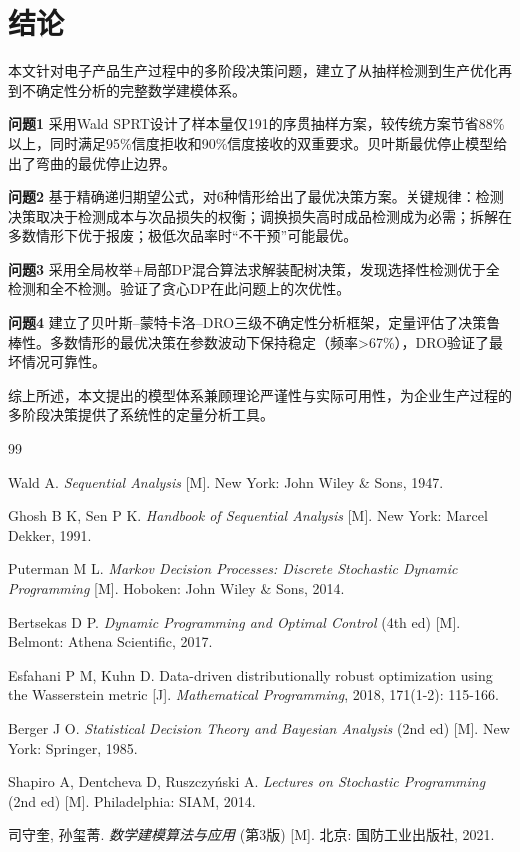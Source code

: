 \documentclass[12pt,a4paper]{ctexart}
\begin{document}
\section{结论}

本文针对电子产品生产过程中的多阶段决策问题，建立了从抽样检测到生产优化再到不确定性分析的完整数学建模体系。

\textbf{问题1} 采用Wald SPRT设计了样本量仅191的序贯抽样方案，较传统方案节省88\%以上，同时满足95\%信度拒收和90\%信度接收的双重要求。贝叶斯最优停止模型给出了弯曲的最优停止边界。

\textbf{问题2} 基于精确递归期望公式，对6种情形给出了最优决策方案。关键规律：检测决策取决于检测成本与次品损失的权衡；调换损失高时成品检测成为必需；拆解在多数情形下优于报废；极低次品率时``不干预''可能最优。

\textbf{问题3} 采用全局枚举+局部DP混合算法求解装配树决策，发现选择性检测优于全检测和全不检测。验证了贪心DP在此问题上的次优性。

\textbf{问题4} 建立了贝叶斯--蒙特卡洛--DRO三级不确定性分析框架，定量评估了决策鲁棒性。多数情形的最优决策在参数波动下保持稳定（频率>67\%），DRO验证了最坏情况可靠性。

综上所述，本文提出的模型体系兼顾理论严谨性与实际可用性，为企业生产过程的多阶段决策提供了系统性的定量分析工具。

\begin{thebibliography}{99}

Wald A. \textit{Sequential Analysis} [M]. New York: John Wiley \& Sons, 1947.

Ghosh B K, Sen P K. \textit{Handbook of Sequential Analysis} [M]. New York: Marcel Dekker, 1991.

Puterman M L. \textit{Markov Decision Processes: Discrete Stochastic Dynamic Programming} [M]. Hoboken: John Wiley \& Sons, 2014.

Bertsekas D P. \textit{Dynamic Programming and Optimal Control} (4th ed) [M]. Belmont: Athena Scientific, 2017.

Esfahani P M, Kuhn D. Data-driven distributionally robust optimization using the Wasserstein metric [J]. \textit{Mathematical Programming}, 2018, 171(1-2): 115-166.

Berger J O. \textit{Statistical Decision Theory and Bayesian Analysis} (2nd ed) [M]. New York: Springer, 1985.

Shapiro A, Dentcheva D, Ruszczy\'{n}ski A. \textit{Lectures on Stochastic Programming} (2nd ed) [M]. Philadelphia: SIAM, 2014.

司守奎, 孙玺菁. \textit{数学建模算法与应用} (第3版) [M]. 北京: 国防工业出版社, 2021.

\end{thebibliography}
\end{document}
